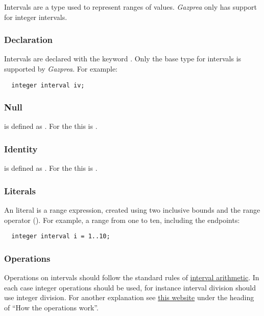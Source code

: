 \documentclass[types.tex]{subfiles}
\begin{document}
Intervals are a type used to represent ranges of values. \textit{Gazprea} only has support for
integer intervals.

\subsubsection{Declaration}
\label{sssec:inteval_decl}
Intervals are declared with the keyword . Only the  base type for
intervals is supported by \textit{Gazprea}. For example:
\begin{lstlisting}
  integer interval iv;
\end{lstlisting}

\subsubsection{Null}
\label{sssec:interval_null}
 is defined as . For the   this is
.

\subsubsection{Identity}
\label{sssec:interval_ident}
 is defined as . For the   this
is .

\subsubsection{Literals}
\label{sssec:interval_lit}
An  literal is a range expression, created using two inclusive bounds and the range
operator (). For example, a range from one to ten, including the endpoints:
\begin{lstlisting}
  integer interval i = 1..10;
\end{lstlisting}

\subsubsection{Operations}
\label{sssec:interval_ops}
Operations on intervals should follow the standard rules of
\href{http://en.wikipedia.org/wiki/Interval_arithmetic}{interval arithmetic}. In each case integer
operations should be used, for instance interval division should use integer division. For another
explanation see \href{http://www.csgnetwork.com/directintervalcalc.html}{this website} under the
heading of ``How the operations work''.
\end{document}
